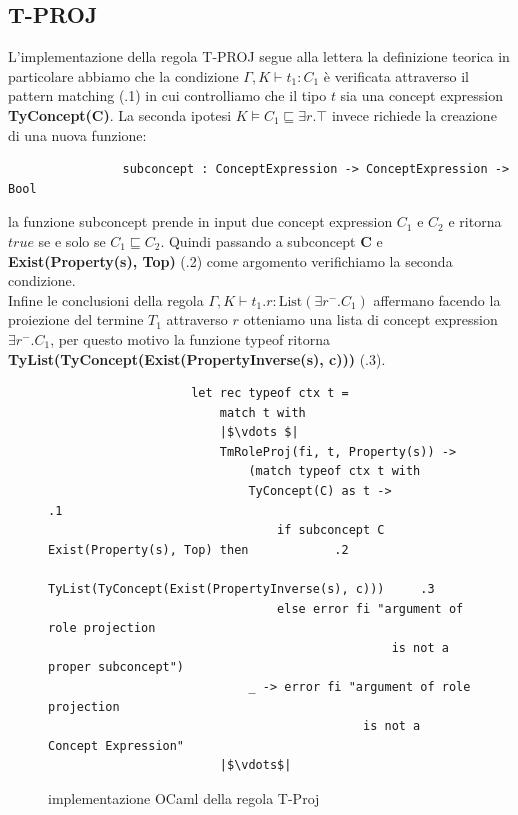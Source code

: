         \subsection{T-PROJ}
            L'implementazione della regola T-PROJ segue alla lettera la definizione teorica in particolare abbiamo che la condizione $\Gamma,K \vdash t_1 : C_1$
            è verificata attraverso il pattern matching (.1) in cui controlliamo che il tipo $t$ sia una concept expression \textbf{TyConcept(C)}. La seconda ipotesi
            $K \vDash C_1 \sqsubseteq \exists r . \top$ invece richiede la creazione di una nuova funzione:
            \begin{verbatim}
                subconcept : ConceptExpression -> ConceptExpression -> Bool
            \end{verbatim}
            la funzione subconcept prende in input due concept expression $C_1$ e $C_2$ e ritorna $true$ se e solo se $C_1 \sqsubseteq C_2$. Quindi passando a subconcept
            \textbf{C} e \textbf{Exist(Property(s), Top)} (.2) come argomento verifichiamo la seconda condizione.
            \\Infine le conclusioni della regola $\Gamma,K \vdash t_1.r : \textrm{List}(\exists r^- . C_1)$ affermano facendo la proiezione del termine $T_1$ attraverso $r$
            otteniamo una lista di concept expression $\exists r^- . C_1$, per questo motivo la funzione typeof ritorna  \textbf{TyList(TyConcept(Exist(PropertyInverse(s), c)))} (.3).
            \begin{figure}[h] 
                \begin{verbatim}
                    let rec typeof ctx t =
                        match t with
                        |$\vdots $|
                        TmRoleProj(fi, t, Property(s)) ->
                            (match typeof ctx t with                                
                            TyConcept(C) as t ->                                        .1
                                if subconcept C Exist(Property(s), Top) then            .2
                                    TyList(TyConcept(Exist(PropertyInverse(s), c)))     .3
                                else error fi "argument of role projection 
                                                is not a proper subconcept")
                            _ -> error fi "argument of role projection 
                                            is not a Concept Expression"
                        |$\vdots$|
                \end{verbatim}
            \caption{implementazione OCaml della regola T-Proj}
            \end{figure}

